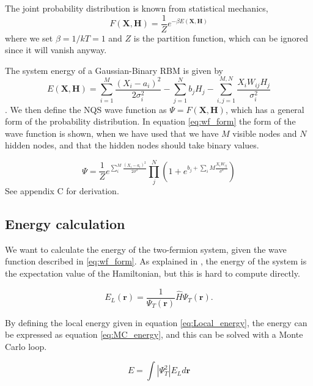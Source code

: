 \documentclass[norsk,a4paper,12pt]{article}
\begin{document}
The joint probability distribution is known from statistical mechanics,
\begin{equation}
\label{eq:F_rbm}
F(\boldsymbol{X},\boldsymbol{H})=\frac{1}{Z}e^{-\beta E(\boldsymbol{X},\boldsymbol{H})}
\end{equation}
where we set $\beta=1/kT=1$ and $Z$ is the partition function, which can be ignored since it will vanish anyway. 

The system energy of a Gaussian-Binary RBM is given by
\begin{equation}
E(\boldsymbol{X},\boldsymbol{H})=\sum_{i=1}^{M}\frac{(X_i-a_i)^2}{2\sigma_i^2}-\sum_{j=1}^Nb_jH_j-\sum_{i,j=1}^{M,N}\frac{X_iW_{ij}H_j}{\sigma_i^2}
\end{equation}
\cite{Hinton}. We then define the NQS wave function as $\Psi = F(\boldsymbol{X},\boldsymbol{H})$, which has a general form of the probability distribution. In equation \ref{eq:wf_form} the form of the wave function is shown, when we have used that we have $M$ visible nodes and $N$ hidden nodes, and that the hidden nodes should take binary values. 

\begin{equation}
\label{eq:wf_form}
	\Psi = \frac{1}{Z} e^{\sum_i^M \frac{(X_i - a_i)^2}{2\sigma^2}} \prod_j^N (1+ e^{b_j + \sum_iM \frac{X_i W_{ij}}{\sigma^2}})
\end{equation}
See appendix C for derivation.

\subsection{Energy calculation} \label{sec:RBM_energy_cal}
We want to calculate the energy of the two-fermion system, given the wave function described in \ref{eq:wf_form}. As explained in \cite{Nordhagen}, the energy of the system is the expectation value of the Hamiltonian, but this is hard to compute directly. 

\begin{equation}
E_L(\boldsymbol{r})=\frac{1}{\Psi_T(\boldsymbol{r})}\hat{H}\Psi_T(\boldsymbol{r}).
\label{eq:Local_energy}
\end{equation}

By defining the local energy given in equation \ref{eq:Local_energy}, the energy can be expressed as equation \ref{eq:MC_energy}, and this can be solved with a Monte Carlo loop.

\begin{equation}
\label{eq:MC_energy}
E = \int | \Psi_T^2| E_L d\boldsymbol{r}
\end{equation}
\end{document}
